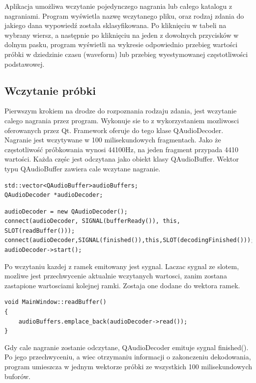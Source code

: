 \documentclass[a4paper,12 pt]{article}
\begin{document}
Aplikacja umożliwa wczytanie pojedynczego nagrania lub całego katalogu z nagraniami. Program wyświetla nazwę wczytanego pliku, oraz rodzaj zdania do jakiego dana wypowiedź została sklasyfikowana. Po kliknięciu w tabeli na wybrany wiersz, a następnie po kliknięciu na jeden z dowolnych przycisków w dolnym pasku, program wyświetli na wykresie odpowiednio przebieg wartości próbki w dziedzinie czasu (waveform) lub przebieg wyestymowanej częstotliwości podstawowej.
\subsection{Wczytanie próbki}
Pierwszym krokiem na drodze do rozpoznania rodzaju zdania, jest wczytanie calego nagrania przez program. Wykonuje sie to z wykorzystaniem mozliwosci oferowanych przez Qt. Framework oferuje do tego klase QAudioDecoder. 
Nagranie jest wczytywane w 100 milisekundowych fragmentach. Jako że częstotliwość próbkowania wynosi 44100Hz, na jeden fragment przypada 4410 wartości. Każda częśc jest odczytana jako obiekt klasy QAudioBuffer. Wektor typu QAudioBuffer zawiera cale wczytane nagranie.
\begin{lstlisting}
std::vector<QAudioBuffer>audioBuffers;
QAudioDecoder *audioDecoder;
\end{lstlisting}
\begin{lstlisting}
audioDecoder = new QAudioDecoder();
connect(audioDecoder, SIGNAL(bufferReady()), this, SLOT(readBuffer()));
connect(audioDecoder,SIGNAL(finished()),this,SLOT(decodingFinished()));
audioDecoder->start();
\end{lstlisting}
Po wczytaniu kazdej z ramek emitowany jest sygnal. Laczac sygnal ze slotem, mozliwe jest przechwycenie aktualnie wczytanych wartosci, zanim zostana zastapione wartosciami kolejnej ramki.
Zostaja one dodane do wektora ramek.
\begin{lstlisting}
void MainWindow::readBuffer()
{
    audioBuffers.emplace_back(audioDecoder->read());
}
\end{lstlisting}
Gdy cale nagranie zostanie odczytane, QAudioDecoder emituje sygnal finished(). Po jego przechwyceniu, a wiec otrzymaniu informacji o zakonczeniu dekodowania, program umieszcza w jednym wektorze próbki ze wszystkich 100 milisekundowych buforów.
\end{document}
